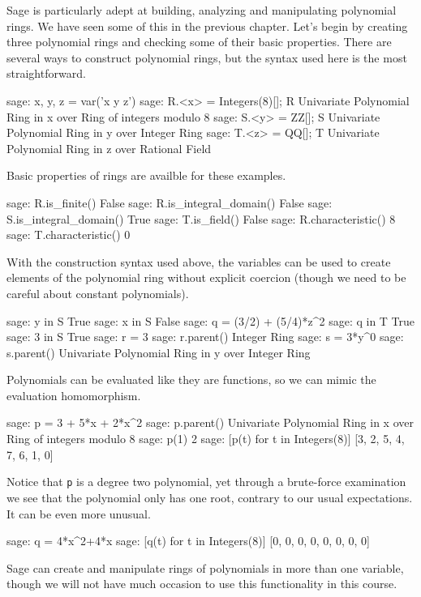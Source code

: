 Sage is particularly adept at building, analyzing and manipulating polynomial rings.  We have seen some of this in the previous chapter.  Let's begin by creating three polynomial rings and checking some of their basic properties.  There are several ways to construct polynomial rings, but the syntax used here is the most straightforward.
%
%
\begin{sageexample}
sage: x, y, z = var('x y z')
sage: R.<x> = Integers(8)[]; R
Univariate Polynomial Ring in x over Ring of integers modulo 8
sage: S.<y> = ZZ[]; S
Univariate Polynomial Ring in y over Integer Ring
sage: T.<z> = QQ[]; T
Univariate Polynomial Ring in z over Rational Field
\end{sageexample}
%
Basic properties of rings are availble for these examples.
%
\begin{sageexample}
sage: R.is_finite()
False
sage: R.is_integral_domain()
False
sage: S.is_integral_domain()
True
sage: T.is_field()
False
sage: R.characteristic()
8
sage: T.characteristic()
0
\end{sageexample}
%
With the construction syntax used above, the variables can be used to create elements of the polynomial ring without explicit coercion (though we need to be careful about constant polynomials).
%
\begin{sageexample}
sage: y in S
True
sage: x in S
False
sage: q = (3/2) + (5/4)*z^2
sage: q in T
True
sage: 3 in S
True
sage: r = 3
sage: r.parent()
Integer Ring
sage: s = 3*y^0
sage: s.parent()
Univariate Polynomial Ring in y over Integer Ring
\end{sageexample}
%
Polynomials can be evaluated like they are functions, so we can mimic the evaluation homomorphism.
%
\begin{sageexample}
sage: p = 3 + 5*x + 2*x^2
sage: p.parent()
Univariate Polynomial Ring in x over Ring of integers modulo 8
sage: p(1)
2
sage: [p(t) for t in Integers(8)]
[3, 2, 5, 4, 7, 6, 1, 0]
\end{sageexample}
%
Notice that \verb?p? is a degree two polynomial, yet through a brute-force examination we see that the polynomial only has one root, contrary to our usual expectations.  It can be even more unusual.
%
\begin{sageexample}
sage: q = 4*x^2+4*x
sage: [q(t) for t in Integers(8)]
[0, 0, 0, 0, 0, 0, 0, 0]
\end{sageexample}
%
Sage can create and manipulate rings of polynomials in more than one variable, though we will not have much occasion to use this functionality in this course.
